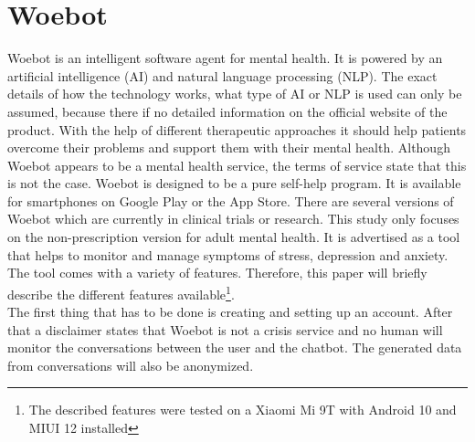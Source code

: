 \section{Woebot}
Woebot is an intelligent software agent for mental health.
It is powered by an artificial intelligence (AI) and natural language processing (NLP).
The exact details of how the technology works, what type of AI or NLP is used can only be assumed, because there if no detailed information on the official website of the product.
With the help of different therapeutic approaches it should help patients overcome their problems and support them with their mental health.
Although Woebot appears to be a mental health service, the terms of service state that this is not the case\cite{woebot-tos}.
Woebot is designed to be a pure self-help program.
It is available for smartphones on Google Play or the App Store\cite{woebot-download}.
There are several versions of Woebot which are currently in clinical trials or research.
This study only focuses on the non-prescription version for adult mental health.
It is advertised as a tool that helps to monitor and manage symptoms of stress, depression and anxiety\cite{woebot-organizations}.
The tool comes with a variety of features.
Therefore, this paper will briefly describe the different features available\footnote{The described features were tested on a Xiaomi Mi 9T with Android 10 and MIUI 12 installed}. \\

The first thing that has to be done is creating and setting up an account.
After that a disclaimer states that Woebot is not a crisis service and no human will monitor the conversations between the user and the chatbot.
The generated data from conversations will also be anonymized. \\

